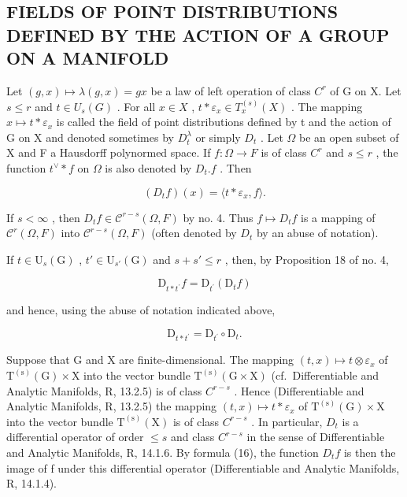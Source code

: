 \subsection{FIELDS OF POINT DISTRIBUTIONS DEFINED BY THE ACTION OF A GROUP ON A MANIFOLD}

Let \((g,x)\mapsto\lambda(g,x)=gx\) be a law of left operation of class \(C^{r}\) of G on X. Let \(s\leqslant r\) and \(t\in U_{s}(G)\) . For all \(x\in X\) , \(t*\varepsilon_{x}\in T_{x}^{(s)}(X)\) . The mapping \(x\mapsto t*\varepsilon_{x}\) is called the field of point distributions defined by t and the action of G on X and denoted sometimes by \(D_{t}^{\lambda}\) or simply \(D_{t}\) . Let \(\Omega\) be an open subset of X and F a Hausdorff polynormed space. If \(f\colon\Omega\to F\) is of class \(C^{r}\) and \(s\leqslant r\) , the function \(t^{\vee}\ast f\) on \(\Omega\) is also denoted by \(D_{t}.f\) . Then

\[
(D _ {t} f) (x) = \langle t * \varepsilon_ {x}, f \rangle .\tag{16}
\]

If \(s < \infty\) , then \(D_t f \in \mathcal{C}^{r-s}(\Omega, F)\) by no. 4. Thus \(f \mapsto D_t f\) is a mapping of \(\mathcal{C}^r(\Omega, F)\) into \(\mathcal{C}^{r-s}(\Omega, F)\) (often denoted by \(D_t\) by an abuse of notation).

If \(t \in \mathrm{U}_s(\mathrm{G})\) , \(t' \in \mathrm{U}_{s'}(\mathrm{G})\) and \(s + s' \leqslant r\) , then, by Proposition 18 of no. 4,

\[
\mathrm{D} _ {t * t ^ {\prime}} f = \mathrm{D} _ {t ^ {\prime}} (\mathrm{D} _ {t} f)\tag{17}
\]

and hence, using the abuse of notation indicated above,

\[
\mathrm{D} _ {t * t ^ {\prime}} = \mathrm{D} _ {t ^ {\prime}} \circ \mathrm{D} _ {t}.\tag{18}
\]

Suppose that G and X are finite-dimensional. The mapping \((t, x) \mapsto t \otimes \varepsilon_{x}\) of \(\mathrm{T}^{(\mathrm{s})}(\mathrm{G}) \times \mathrm{X}\) into the vector bundle \(\mathrm{T}^{(\mathrm{s})}(\mathrm{G} \times \mathrm{X})\) (cf.~Differentiable and Analytic Manifolds, R, 13.2.5) is of class \(C^{r-s}\) . Hence (Differentiable and Analytic Manifolds, R, 13.2.5) the mapping \((t, x) \mapsto t * \varepsilon_{x}\) of \(\mathrm{T}^{(\mathrm{s})}(\mathrm{G}) \times \mathrm{X}\) into the vector bundle \(\mathrm{T}^{(\mathrm{s})}(\mathrm{X})\) is of class \(C^{r-s}\) . In particular, \(D_{t}\) is a differential operator of order \(\leqslant s\) and class \(C^{r-s}\) in the sense of Differentiable and Analytic Manifolds, R, 14.1.6. By formula (16), the function \(D_{t}f\) is then the image of f under this differential operator (Differentiable and Analytic Manifolds, R, 14.1.4).

